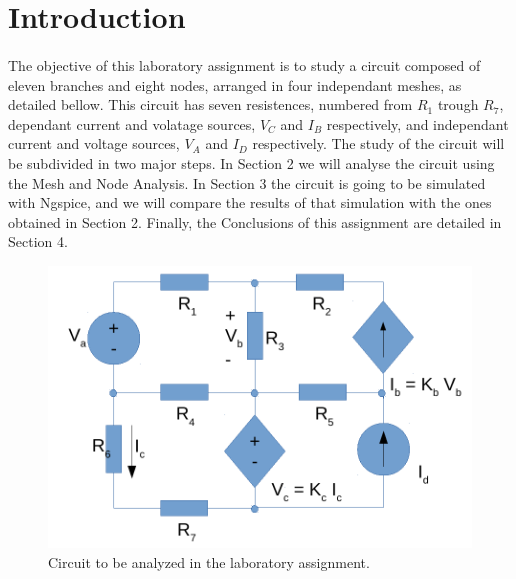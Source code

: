 \section{Introduction}
\label{sec:introduction}

\paragraph{} The objective of this laboratory assignment is to study a circuit composed of eleven branches and eight nodes, arranged in four independant meshes,
 as detailed bellow. This circuit has seven resistences, numbered from $R_1$ trough $R_7$, dependant current and volatage sources, $V_C$ and $I_B$ respectively,
 and independant current and voltage sources, $V_A$ and $I_D$ respectively.
The study of the circuit will be subdivided in two major steps. In Section 2 we will analyse the circuit using the Mesh and Node Analysis. In Section 3 the circuit is going to be simulated with Ngspice, and we will compare the results of that simulation with the ones obtained in Section 2.
Finally, the Conclusions of this assignment are detailed in Section 4.

\begin{figure}[h] \centering
\includegraphics[width=0.5\linewidth]{circuit.pdf}
\caption{Circuit to be analyzed in the laboratory assignment.}
\label{fig:rc}
\end{figure}

